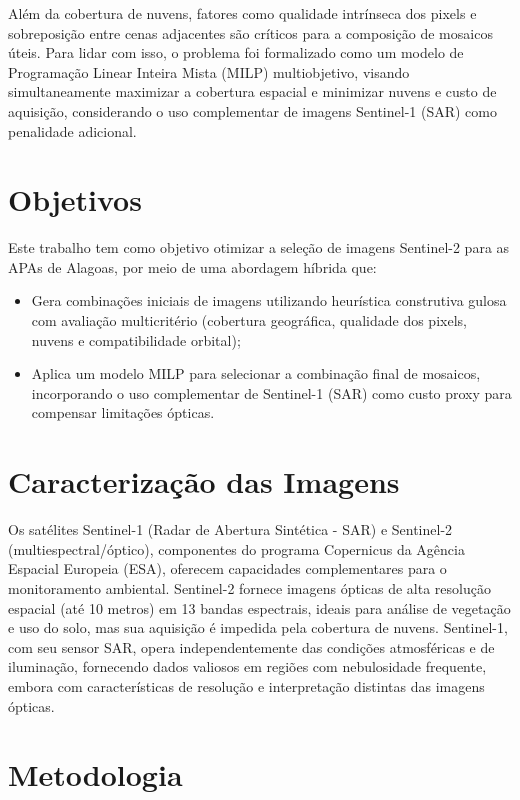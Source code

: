 \documentclass[a4paper,11pt]{article}
\begin{document}
Além da cobertura de nuvens, fatores como qualidade intrínseca dos pixels e sobreposição entre cenas adjacentes são críticos para a composição de mosaicos úteis. Para lidar com isso, o problema foi formalizado como um modelo de Programação Linear Inteira Mista (MILP) multiobjetivo, visando simultaneamente maximizar a cobertura espacial e minimizar nuvens e custo de aquisição, considerando o uso complementar de imagens Sentinel-1 (SAR) como penalidade adicional.

\section{Objetivos}
Este trabalho tem como objetivo otimizar a seleção de imagens Sentinel-2 para as APAs de Alagoas, por meio de uma abordagem híbrida que:

\begin{itemize}
    \item Gera combinações iniciais de imagens utilizando heurística construtiva gulosa com avaliação multicritério (cobertura geográfica, qualidade dos pixels, nuvens e compatibilidade orbital);
    \item Aplica um modelo MILP para selecionar a combinação final de mosaicos, incorporando o uso complementar de Sentinel-1 (SAR) como custo proxy para compensar limitações ópticas.
\end{itemize}

\section{Caracterização das Imagens}
Os satélites Sentinel-1 (Radar de Abertura Sintética - SAR) e Sentinel-2 (multiespectral/óptico), componentes do programa Copernicus da Agência Espacial Europeia (ESA), oferecem capacidades complementares para o monitoramento ambiental. Sentinel-2 fornece imagens ópticas de alta resolução espacial (até 10 metros) em 13 bandas espectrais, ideais para análise de vegetação e uso do solo, mas sua aquisição é impedida pela cobertura de nuvens. Sentinel-1, com seu sensor SAR, opera independentemente das condições atmosféricas e de iluminação, fornecendo dados valiosos em regiões com nebulosidade frequente, embora com características de resolução e interpretação distintas das imagens ópticas.

\section{Metodologia}
\end{document}

